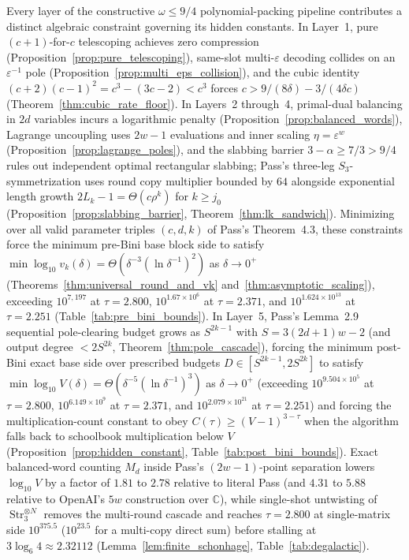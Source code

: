 \documentclass[11pt,a4paper]{article}
\theoremstyle{plain}
\theoremstyle{definition}
\theoremstyle{remark}
\newcommand{\C}{\mathbb{C}}
\DeclareMathOperator{\Str}{Str}
\begin{document}
Every layer of the constructive $\omega \le 9/4$ polynomial-packing pipeline contributes a distinct algebraic constraint governing its hidden constants. In Layer~1, pure $(c + 1)$-for-$c$ telescoping achieves zero compression (Proposition~\ref{prop:pure_telescoping}), same-slot multi-$\varepsilon$ decoding collides on an $\varepsilon^{-1}$ pole (Proposition~\ref{prop:multi_eps_collision}), and the cubic identity $(c + 2)(c - 1)^2 = c^3 - (3c - 2) < c^3$ forces $c > 9/(8\delta) - 3/(4\delta c)$ (Theorem~\ref{thm:cubic_rate_floor}). In Layers~2 through~4, primal-dual balancing in $2d$ variables incurs a logarithmic penalty (Proposition~\ref{prop:balanced_words}), Lagrange uncoupling uses $2w - 1$ evaluations and inner scaling $\eta = \varepsilon^w$ (Proposition~\ref{prop:lagrange_poles}), and the slabbing barrier $3 - \alpha \ge 7/3 > 9/4$ rules out independent optimal rectangular slabbing; Pass's three-leg $S_3$-symmetrization uses round copy multiplier bounded by $64$ alongside exponential length growth $2 L_k - 1 = \Theta(c\rho^k)$ for $k \ge j_0$ (Proposition~\ref{prop:slabbing_barrier}, Theorem~\ref{thm:lk_sandwich}). Minimizing over all valid parameter triples $(c, d, k)$ of Pass's Theorem~4.3, these constraints force the minimum pre-Bini base block side to satisfy $\min \log_{10} v_k(\delta) = \Theta(\delta^{-3}(\ln\delta^{-1})^2)$ as $\delta \to 0^+$ (Theorems~\ref{thm:universal_round_and_vk} and~\ref{thm:asymptotic_scaling}), exceeding $10^{7{,}197}$ at $\tau = 2.800$, $10^{1.67 \times 10^6}$ at $\tau = 2.371$, and $10^{1.624 \times 10^{13}}$ at $\tau = 2.251$ (Table~\ref{tab:pre_bini_bounds}). In Layer~5, Pass's Lemma~2.9 sequential pole-clearing budget grows as $S^{2k-1}$ with $S = 3(2d + 1)w - 2$ (and output degree $< 2 S^{2k}$, Theorem~\ref{thm:pole_cascade}), forcing the minimum post-Bini exact base side over prescribed budgets $D \in [S^{2k-1}, 2 S^{2k}]$ to satisfy $\min \log_{10} V(\delta) = \Theta(\delta^{-5}(\ln\delta^{-1})^3)$ as $\delta \to 0^+$ (exceeding $10^{9.504 \times 10^5}$ at $\tau = 2.800$, $10^{6.149 \times 10^9}$ at $\tau = 2.371$, and $10^{2.079 \times 10^{21}}$ at $\tau = 2.251$) and forcing the multiplication-count constant to obey $C(\tau) \ge (V - 1)^{3-\tau}$ when the algorithm falls back to schoolbook multiplication below $V$ (Proposition~\ref{prop:hidden_constant}, Table~\ref{tab:post_bini_bounds}). Exact balanced-word counting $M_d$ inside Pass's $(2w - 1)$-point separation lowers $\log_{10} V$ by a factor of $1.81$ to $2.78$ relative to literal Pass (and $4.31$ to $5.88$ relative to OpenAI's $5w$ construction over $\C$), while single-shot untwisting of $\Str_3^{\otimes N}$ removes the multi-round cascade and reaches $\tau = 2.800$ at single-matrix side $10^{375.5}$ ($10^{23.5}$ for a multi-copy direct sum) before stalling at $3\log_6 4 \approx 2.32112$ (Lemma~\ref{lem:finite_schonhage}, Table~\ref{tab:degalactic}).
\end{document}
